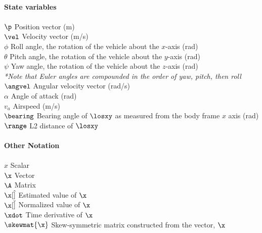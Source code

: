 \begin{tabbing}
\\[5pt]
\textbf{State variables}\\
\\[5pt]
$\p$ 	   \> Position vector (m) \\
$\vel$	   \> Velocity vector (m/s) \\
$\phi$     \> Roll angle, the rotation of the vehicle about the $x$-axis (rad) \\
$\theta$   \> Pitch angle, the rotation of the vehicle about the $y$-axis (rad) \\
$\psi$     \> Yaw angle, the rotation of the vehicle about the $z$-axis (rad) \\
		   \> \textit{*Note that Euler angles are compounded in the order of yaw, pitch, then roll} \\
$\angvel$  \> Angular velocity vector (rad/s) \\
$\alpha$   \> Angle of attack (rad) \\
$v_a$	   \> Airspeed (m/s) \\
$\bearing$ \> Bearing angle of $\losxy$ as measured from the body frame $x$ axis (rad) \\
$\range$   \> L2 distance of $\losxy$ \\

\\[5pt]
\textbf{Other Notation} \\
\\[5pt]
$x$				\> Scalar \\
$\x$			\> Vector \\
$\A$			\> Matrix \\
$\x[\hat]$  	\> Estimated value of $\x$ \\
$\x[\check]$ 	\> Normalized value of $\x$ \\
$\xdot$ 		\> Time derivative of $\x$ \\
$\skewmat{\x}$  \> Skew-symmetric matrix constructed from the vector, $\x$ \\

\end{tabbing} 
